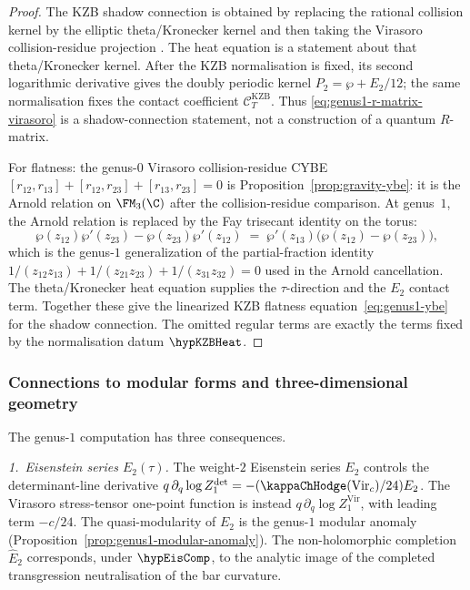 \begin{proof}
The KZB shadow connection is obtained by replacing the rational
collision kernel by the elliptic theta/Kronecker kernel and then taking
the Virasoro collision-residue projection
\cite{Bernard1988,CalaqueEnriquezEtingof2009}.  The heat equation is a
statement about that theta/Kronecker kernel.  After the KZB
normalisation is fixed, its second logarithmic derivative gives
the doubly periodic kernel \(P_2=\wp+E_2/12\); the same normalisation
fixes the contact coefficient
\(\mathcal C_T^{\mathrm{KZB}}\).  Thus
\eqref{eq:genus1-r-matrix-virasoro} is a shadow-connection statement,
not a construction of a quantum \(R\)-matrix.

For flatness: the genus-$0$ Virasoro collision-residue CYBE
$[r_{12}, r_{13}] + [r_{12}, r_{23}] + [r_{13}, r_{23}] = 0$
is Proposition~\ref{prop:gravity-ybe}: it is the Arnold relation on
\(\FM_3(\C)\) after the collision-residue comparison. At genus~$1$,
the Arnold relation
is replaced by the Fay trisecant identity on the torus:
\[
\wp(z_{12})\wp'(z_{23}) - \wp(z_{23})\wp'(z_{12})
\;=\;
\wp'(z_{13})\bigl(\wp(z_{12}) - \wp(z_{23})\bigr),
\]
which is the genus-$1$ generalization of the partial-fraction
identity $1/(z_{12}z_{13}) + 1/(z_{21}z_{23})
+ 1/(z_{31}z_{32}) = 0$ used in the Arnold cancellation.
The theta/Kronecker heat equation supplies the \(\tau\)-direction and
the \(E_2\) contact term.  Together these give the linearized KZB
flatness equation~\eqref{eq:genus1-ybe} for the shadow connection.
The omitted regular terms are exactly the terms fixed by the
normalisation datum \(\hypKZBHeat\).
\end{proof}

\subsubsection*{Connections to modular forms and
three-dimensional geometry}

The genus-$1$ computation has three consequences.

\emph{1.\ Eisenstein series $E_2(\tau)$.}
The weight-$2$ Eisenstein series $E_2$ controls the determinant-line
derivative
$q\,\partial_q\log Z^{\mathrm{det}}_1
=-(\kappaChHodge(\mathrm{Vir}_c)/24)E_2$. The Virasoro
stress-tensor one-point function is instead
$q\,\partial_q\log Z^{\mathrm{Vir}}_1$, with leading term $-c/24$.
The quasi-modularity of $E_2$ is the genus-$1$ modular anomaly
(Proposition~\ref{prop:genus1-modular-anomaly}). The
non-holomorphic completion $\widehat{E}_2$ corresponds, under
\(\hypEisComp\), to the analytic image of the completed transgression
neutralisation of the bar curvature.

